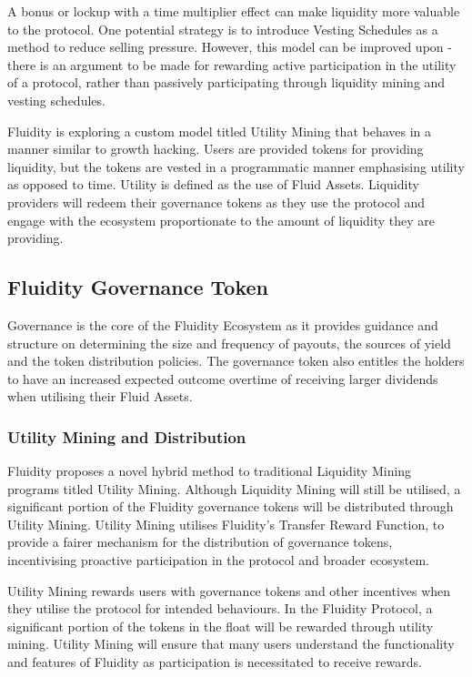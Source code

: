 A bonus or lockup with a time multiplier effect can make liquidity more valuable to the protocol. One potential strategy is to introduce Vesting Schedules as a method to reduce selling pressure. However, this model can be improved upon - there is an argument to be made for rewarding active participation in the utility of a protocol, rather than passively participating through liquidity mining and vesting schedules.

Fluidity is exploring a custom model titled Utility Mining that behaves in a manner similar to growth hacking. Users are provided tokens for providing liquidity, but the tokens are vested in a programmatic manner emphasising utility as opposed to time. Utility is defined as the use of Fluid Assets. Liquidity providers will redeem their governance tokens as they use the protocol and engage with the ecosystem proportionate to the amount of liquidity they are providing.

\subsection{Fluidity Governance Token}

Governance is the core of the Fluidity Ecosystem as it provides guidance and structure on determining the size and frequency of payouts, the sources of yield and the token distribution policies. The governance token also entitles the holders to have an increased expected outcome overtime of receiving larger dividends when utilising their Fluid Assets.


\subsubsection{Utility Mining and Distribution}

Fluidity proposes a novel hybrid method to traditional Liquidity Mining programs titled Utility Mining. Although Liquidity Mining will still be utilised, a significant portion of the Fluidity governance tokens will be distributed through Utility Mining. Utility Mining utilises Fluidity's Transfer Reward Function, to provide a fairer mechanism for the distribution of governance tokens, incentivising proactive participation in the protocol and broader ecosystem.

Utility Mining rewards users with governance tokens and other incentives when they utilise the protocol for intended behaviours. In the Fluidity Protocol, a significant portion of the tokens in the float will be rewarded through utility mining. Utility Mining will ensure that many users understand the functionality and features of Fluidity as participation is necessitated to receive rewards.

